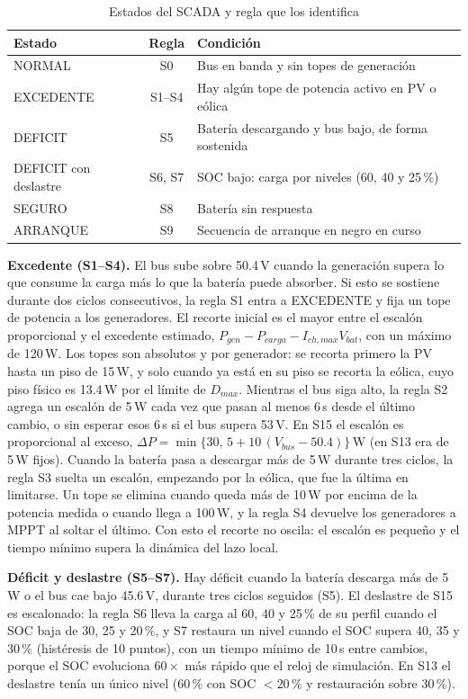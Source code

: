 \documentclass[conference]{IEEEtran}
\begin{document}
\begin{table}[H]
\caption{Estados del SCADA y regla que los identifica}
\label{tab:estados_scada}
\centering
\scriptsize\setlength{\tabcolsep}{3pt}
\begin{tabular}{|l|c|p{3.3cm}|}
\hline
\textbf{Estado} & \textbf{Regla} & \textbf{Condición} \\
\hline
NORMAL & S0 & Bus en banda y sin topes de generación \\ \hline
EXCEDENTE & S1--S4 & Hay algún tope de potencia activo en PV o eólica \\ \hline
DEFICIT & S5 & Batería descargando y bus bajo, de forma sostenida \\ \hline
DEFICIT con deslastre & S6, S7 & SOC bajo: carga por niveles (60, 40 y 25\,\%) \\ \hline
SEGURO & S8 & Batería sin respuesta \\ \hline
ARRANQUE & S9 & Secuencia de arranque en negro en curso \\ \hline
\end{tabular}
\end{table}

\textbf{Excedente (S1--S4).} El bus sube sobre 50.4\,V cuando la generación supera lo que consume la carga más lo que la batería puede absorber. Si esto se sostiene durante dos ciclos consecutivos, la regla S1 entra a EXCEDENTE y fija un tope de potencia a los generadores. El recorte inicial es el mayor entre el escalón proporcional y el excedente estimado, $P_{gen}-P_{carga}-I_{ch,max}V_{bat}$, con un máximo de 120\,W. Los topes son absolutos y por generador: se recorta primero la PV hasta un piso de 15\,W, y solo cuando ya está en su piso se recorta la eólica, cuyo piso físico es 13.4\,W por el límite de $D_{max}$. Mientras el bus siga alto, la regla S2 agrega un escalón de 5\,W cada vez que pasan al menos 6\,s desde el último cambio, o sin esperar esos 6\,s si el bus supera 53\,V. En S15 el escalón es proporcional al exceso, $\Delta P=\min\{30,\,5+10\,(V_{bus}-50.4)\}$\,W (en S13 era de 5\,W fijos). Cuando la batería pasa a descargar más de 5\,W durante tres ciclos, la regla S3 suelta un escalón, empezando por la eólica, que fue la última en limitarse. Un tope se elimina cuando queda más de 10\,W por encima de la potencia medida o cuando llega a 100\,W, y la regla S4 devuelve los generadores a MPPT al soltar el último. Con esto el recorte no oscila: el escalón es pequeño y el tiempo mínimo supera la dinámica del lazo local.

\textbf{Déficit y deslastre (S5--S7).} Hay déficit cuando la batería descarga más de 5\,W o el bus cae bajo 45.6\,V, durante tres ciclos seguidos (S5). El deslastre de S15 es escalonado: la regla S6 lleva la carga al 60, 40 y 25\,\% de su perfil cuando el SOC baja de 30, 25 y 20\,\%, y S7 restaura un nivel cuando el SOC supera 40, 35 y 30\,\% (histéresis de 10 puntos), con un tiempo mínimo de 10\,s entre cambios, porque el SOC evoluciona $60\times$ más rápido que el reloj de simulación. En S13 el deslastre tenía un único nivel (60\,\% con SOC $<20$\,\% y restauración sobre 30\,\%).
\end{document}
